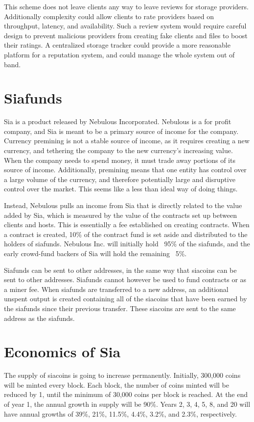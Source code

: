 \documentclass[twocolumn]{article}
\begin{document}
This scheme does not leave clients any way to leave reviews for storage providers.
Additionally complexity could allow clients to rate providers based on throughput, latency, and availability.
Such a review system would require careful design to prevent malicious providers from creating fake clients and files to boost their ratings.
A centralized storage tracker could provide a more reasonable platform for a reputation system, and could manage the whole system out of band.

\section{Siafunds}
Sia is a product released by Nebulous Incorporated.
Nebulous is a for profit company, and Sia is meant to be a primary source of income for the company.
Currency premining is not a stable source of income, as it requires creating a new currency, and tethering the company to the new currency's increasing value.
When the company needs to spend money, it must trade away portions of its source of income.
Additionally, premining means that one entity has control over a large volume of the currency, and therefore potentially large and disruptive control over the market.
This seems like a less than ideal way of doing things.

Instead, Nebulous pulls an income from Sia that is directly related to the value added by Sia, which is measured by the value of the contracts set up between clients and hosts.
This is essentially a fee established on creating contracts.
When a contract is created, 10\% of the contract fund is set aside and distributed to the holders of siafunds.
Nebulous Inc. will initially hold ~95\% of the siafunds, and the early crowd-fund backers of Sia will hold the remaining ~5\%.

Siafunds can be sent to other addresses, in the same way that siacoins can be sent to other addresses.
Siafunds cannot however be used to fund contracts or as a miner fee.
When siafunds are transferred to a new address, an additional unspent output is created containing all of the siacoins that have been earned by the siafunds since their previous transfer.
These siacoins are sent to the same address as the siafunds.

\section{Economics of Sia}
The supply of siacoins is going to increase permanently.
Initially, 300,000 coins will be minted every block.
Each block, the number of coins minted will be reduced by 1, until the minimum of 30,000 coins per block is reached.
At the end of year 1, the annual growth in supply will be 90\%.
Years 2, 3, 4, 5, 8, and 20 will have annual growths of 39\%, 21\%, 11.5\%, 4.4\%, 3.2\%, and 2.3\%, respectively.
\end{document}
